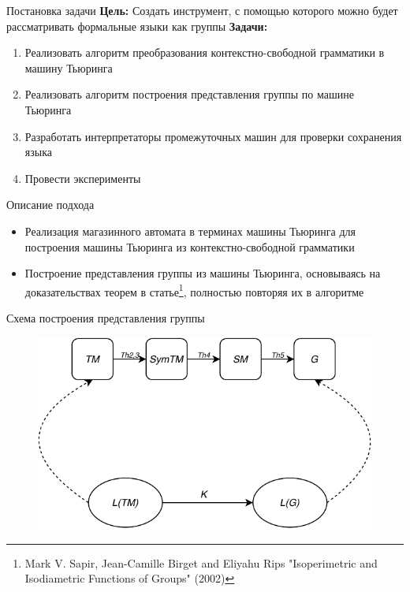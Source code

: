 \documentclass[xcolor=table]{beamer}
\begin{document}
\begin{frame}[fragile]{Постановка задачи}
\textbf{Цель:} Создать инструмент, с помощью которого можно будет рассматривать формальные языки как группы
\newline
\newline
\textbf{Задачи:}
    \begin{enumerate}
    \item Реализовать алгоритм преобразования контекстно-свободной грамматики в машину Тьюринга
    \item Реализовать алгоритм построения представления группы по машине Тьюринга
    \item Разработать интерпретаторы промежуточных машин для проверки сохранения языка
    \item Провести эксперименты
\end{enumerate}
\end{frame}

\begin{frame}[fragile]{Описание подхода}
    \begin{itemize}
        \item Реализация магазинного автомата в терминах машины Тьюринга для построения машины Тьюринга из контекстно-свободной грамматики
        \item Построение представления группы из машины Тьюринга, основываясь на доказательствах теорем в статье\footnote{Mark V. Sapir, Jean-Camille Birget and Eliyahu Rips "Isoperimetric and Isodiametric Functions of Groups" (2002)}, полностью повторяя их в алгоритме
    \end{itemize}
\end{frame}

\begin{frame}[fragile]{Схема построения представления группы}
\begin{figure}[H]
  \centering
  \includegraphics[width=120mm]{pictures/2.pdf}
 \end{figure}
\end{frame}
\end{document}
